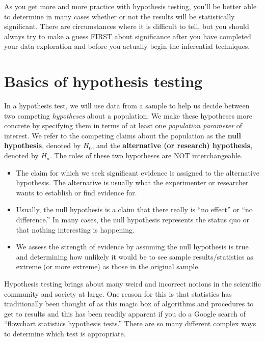 \documentclass[12pt,]{krantz}
\providecommand{\tightlist}{%
  \setlength{\itemsep}{0pt}\setlength{\parskip}{0pt}}
\theoremstyle{definition}
\theoremstyle{definition}
\theoremstyle{definition}
\theoremstyle{remark}
\begin{document}
As you get more and more practice with hypothesis testing, you'll be
better able to determine in many cases whether or not the results will
be statistically significant. There are circumstances where it is
difficult to tell, but you should always try to make a guess FIRST about
significance after you have completed your data exploration and before
you actually begin the inferential techniques.

\section{Basics of hypothesis testing}\label{ht-basics}

In a hypothesis test, we will use data from a sample to help us decide
between two competing \emph{hypotheses} about a population. We make
these hypotheses more concrete by specifying them in terms of at least
one \emph{population parameter} of interest. We refer to the competing
claims about the population as the \textbf{null hypothesis}, denoted by
\(H_0\), and the \textbf{alternative (or research) hypothesis}, denoted
by \(H_a\). The roles of these two hypotheses are NOT interchangeable.

\begin{itemize}
\tightlist
\item
  The claim for which we seek significant evidence is assigned to the
  alternative hypothesis. The alternative is usually what the
  experimenter or researcher wants to establish or find evidence for.
\item
  Usually, the null hypothesis is a claim that there really is ``no
  effect'' or ``no difference.'' In many cases, the null hypothesis
  represents the status quo or that nothing interesting is happening.\\
\item
  We assess the strength of evidence by assuming the null hypothesis is
  true and determining how unlikely it would be to see sample
  results/statistics as extreme (or more extreme) as those in the
  original sample.
\end{itemize}

Hypothesis testing brings about many weird and incorrect notions in the
scientific community and society at large. One reason for this is that
statistics has traditionally been thought of as this magic box of
algorithms and procedures to get to results and this has been readily
apparent if you do a Google search of ``flowchart statistics hypothesis
tests.'' There are so many different complex ways to determine which
test is appropriate.
\end{document}
